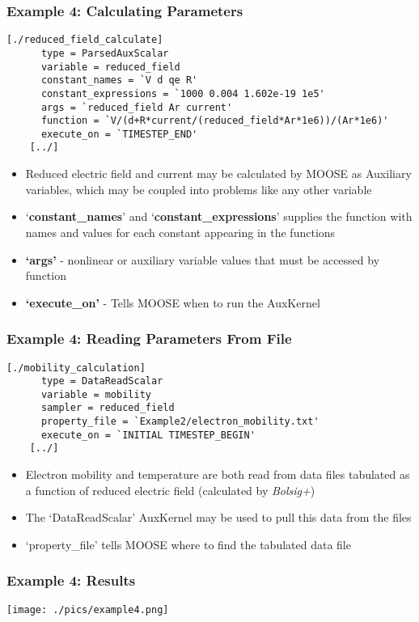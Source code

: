\begin{frame}[fragile]
	\frametitle{Example 4: Calculating Parameters}
		\begin{Verbatim}[fontsize=\scriptsize]
    [./reduced_field_calculate]
      type = ParsedAuxScalar
      variable = reduced_field
      constant_names = `V d qe R'
      constant_expressions = `1000 0.004 1.602e-19 1e5'
      args = `reduced_field Ar current'
      function = `V/(d+R*current/(reduced_field*Ar*1e6))/(Ar*1e6)'
      execute_on = `TIMESTEP_END'
    [../]
	\end{Verbatim}

	\begin{itemize}
		\item Reduced electric field and current may be calculated by MOOSE as Auxiliary variables, which may be coupled into problems like any other variable
		\item `\textbf{constant\_names}' and `\textbf{constant\_expressions}' supplies the function with names and values for each constant appearing in the functions
		\item \textbf{`args'} - nonlinear or auxiliary variable values that must be accessed by function
		\item \textbf{`execute\_on'} - Tells MOOSE when to run the AuxKernel
	\end{itemize}

\end{frame}

\begin{frame}[fragile]
	\frametitle{Example 4: Reading Parameters From File}
		\begin{Verbatim}[fontsize=\footnotesize]
    [./mobility_calculation]
      type = DataReadScalar
      variable = mobility
      sampler = reduced_field
      property_file = `Example2/electron_mobility.txt'
      execute_on = `INITIAL TIMESTEP_BEGIN'
    [../]
	\end{Verbatim}

	\begin{itemize}
		\item Electron mobility and temperature are both read from data files tabulated as a function of reduced electric field (calculated by \textit{Bolsig+})
		\item The `DataReadScalar' AuxKernel may be used to pull this data from the files
		\item `property\_file' tells MOOSE where to find the tabulated data file
	\end{itemize}

\end{frame}

\begin{frame}
	\frametitle{Example 4: Results}
	\centering
	\texttt{[image: ./pics/example4.png]}
\end{frame}